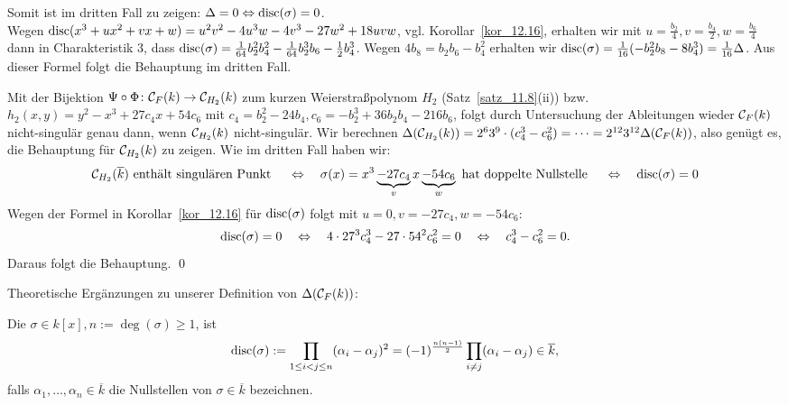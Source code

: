 \begin{bew}[Fortsetzung]
	Somit ist im dritten Fall zu zeigen: $\Delta = 0 \Leftrightarrow \operatorname{disc}(\sigma)=0$. \\
	Wegen $\operatorname{disc}(x^3 + ux^2 + vx + w) = u^2v^2 - 4u^3w - 4v^3 - 27w^2 + 18uvw$, vgl. Korollar~\ref{kor_12.16}, erhalten wir mit $u = \frac{b_2}{4}, v = \frac{b_4}{2}, w= \frac{b_6}{4}$ dann in Charakteristik $3$, dass $\operatorname{disc}(\sigma) = \frac{1}{64} b_2^2 b_4^2 - \frac{1}{64} b_2^3 b_6 - \frac{1}{2} b_4^3$. Wegen $4 b_8 = b_2 b_6 - b_4^2$ erhalten wir $\operatorname{disc}(\sigma) = \frac{1}{16} (-b_2^2b_8 - 8b_4^3) = \frac{1}{16} \Delta$. Aus dieser Formel folgt die Behauptung im dritten Fall.
\end{bew}

\begin{bew}[4. Fall: $\Char(k) > 3$ oder $\Char(k) = 0$]
	Mit der Bijektion $\Psi \circ \Phi \colon \mathcal{C}_F(k) \rightarrow \mathcal{C}_{H_2}(k)$ zum kurzen Weierstraßpolynom $H_2$ (Satz~\ref{satz_11.8}(ii)) bzw. $h_2(x,y) = y^2 - x^3 + 27c_4x + 54c_6$ mit $c_4 = b_2^2 - 24b_4, c_6 = -b_2^3 + 36b_2 b_4 - 216 b_6$, folgt durch Untersuchung der Ableitungen wieder $\mathcal{C}_F(k)$ nicht-singulär genau dann, wenn $\mathcal{C}_{H_2}(k)$ nicht-singulär. Wir berechnen $\Delta(\mathcal{C}_{H_2}(k)) = 2^6 3^9 \cdot (c_4^3-c_6^2) = \dots = 2^{12} 3^{12} \Delta(\mathcal{C}_F(k))$, also genügt es, die Behauptung für $\mathcal{C}_{H_2}(k)$ zu zeigen. Wie im dritten Fall haben wir:
	\[ \mathcal{C}_{H_2}(\overline{k}) \text{ enthält singulären Punkt } \quad \Leftrightarrow \quad \sigma(x) = x^3 \underbrace{- 27c_4}_{v} x \underbrace{- 54 c_6}_{w} \text{ hat doppelte Nullstelle } \quad \Leftrightarrow \quad \operatorname{disc}(\sigma)=0 \]
	Wegen der Formel in Korollar~\ref{kor_12.16} für $\operatorname{disc}(\sigma)$ folgt mit $u = 0, v = -27c_4, w= - 54c_6$:
	\[ \operatorname{disc}(\sigma) = 0 \quad \Leftrightarrow \quad 4 \cdot 27^3 c_4^3 - 27 \cdot 54^2 c_6^2 = 0 \quad \Leftrightarrow \quad c_4^3 - c_6^2 = 0. \]
	Daraus folgt die Behauptung. \qed
\end{bew}

Theoretische Ergänzungen zu unserer Definition von $\Delta(\mathcal{C}_F(k))$:
\begin{defn}
	Die  $\sigma \in k[x], n := \deg(\sigma) \geq 1$, ist 
	\[ \operatorname{disc}(\sigma) := \prod_{1 \leq i < j \leq n} (\alpha_i - \alpha_j)^2 = (-1)^{\frac{n(n-1)}{2}} \prod_{i \neq j} (\alpha_i - \alpha_j) \in \overline{k},\]
	falls $\alpha_1, \dots, \alpha_n \in \overline{k}$ die Nullstellen von $\sigma \in \overline{k}$ bezeichnen.
\end{defn}

